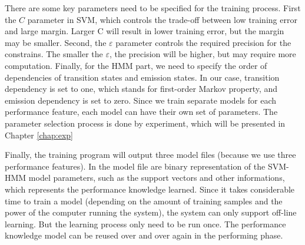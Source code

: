 There are some key parameters need to be specified for the training process. First the $C$ parameter in SVM, which controls the trade-off between low training error and large margin. Larger C will result in lower training error, but the margin may be smaller. Second, the $\varepsilon$ parameter controls the required precision for the constrains. The smaller the $\varepsilon$, the precision will be higher, but may require more computation. Finally, for the HMM part, we need to specify the order of dependencies of transition states and emission states. In our case, transition dependency is set to one, which stands for first-order Markov property, and emission dependency is set to zero. Since we train separate models for each performance feature, each model can have their own set of parameters. The parameter selection process is done by experiment, which will be presented in Chapter \ref{chap:exp}

Finally, the training program will output three model files (because we use three performance features). In the model file are binary representation of the SVM-HMM model parameters, such as the support vectors and other informations, which represents the performance knowledge learned.  Since it takes considerable time to train a model (depending on the amount of training samples and the power of the computer running the system), the system can only support off-line learning. But the learning process only need to be run once. The performance knowledge model can be reused over and over again in the performing phase.



